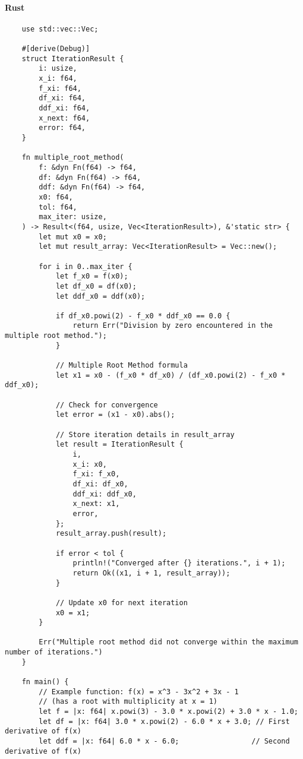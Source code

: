 \documentclass{article}
\begin{document}
            \paragraph{Rust}
                \begin{verbatim}
    use std::vec::Vec;

    #[derive(Debug)]
    struct IterationResult {
        i: usize,
        x_i: f64,
        f_xi: f64,
        df_xi: f64,
        ddf_xi: f64,
        x_next: f64,
        error: f64,
    }

    fn multiple_root_method(
        f: &dyn Fn(f64) -> f64,
        df: &dyn Fn(f64) -> f64,
        ddf: &dyn Fn(f64) -> f64,
        x0: f64,
        tol: f64,
        max_iter: usize,
    ) -> Result<(f64, usize, Vec<IterationResult>), &'static str> {
        let mut x0 = x0;
        let mut result_array: Vec<IterationResult> = Vec::new();

        for i in 0..max_iter {
            let f_x0 = f(x0);
            let df_x0 = df(x0);
            let ddf_x0 = ddf(x0);

            if df_x0.powi(2) - f_x0 * ddf_x0 == 0.0 {
                return Err("Division by zero encountered in the multiple root method.");
            }

            // Multiple Root Method formula
            let x1 = x0 - (f_x0 * df_x0) / (df_x0.powi(2) - f_x0 * ddf_x0);

            // Check for convergence
            let error = (x1 - x0).abs();

            // Store iteration details in result_array
            let result = IterationResult {
                i,
                x_i: x0,
                f_xi: f_x0,
                df_xi: df_x0,
                ddf_xi: ddf_x0,
                x_next: x1,
                error,
            };
            result_array.push(result);

            if error < tol {
                println!("Converged after {} iterations.", i + 1);
                return Ok((x1, i + 1, result_array));
            }

            // Update x0 for next iteration
            x0 = x1;
        }

        Err("Multiple root method did not converge within the maximum number of iterations.")
    }

    fn main() {
        // Example function: f(x) = x^3 - 3x^2 + 3x - 1
        // (has a root with multiplicity at x = 1)
        let f = |x: f64| x.powi(3) - 3.0 * x.powi(2) + 3.0 * x - 1.0;
        let df = |x: f64| 3.0 * x.powi(2) - 6.0 * x + 3.0; // First derivative of f(x)
        let ddf = |x: f64| 6.0 * x - 6.0;                 // Second derivative of f(x)


\end{verbatim}
\end{document}
